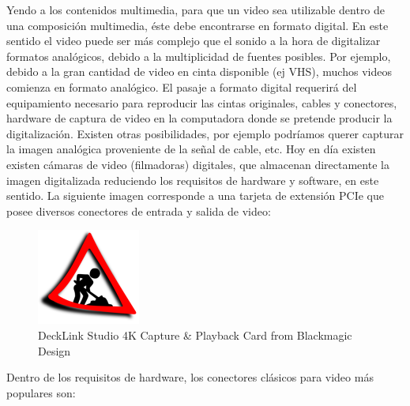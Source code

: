 \documentclass[12pt]{article}
\begin{document}
Yendo a los contenidos multimedia, para que un video sea utilizable dentro de 
una composición multimedia, éste debe encontrarse en formato digital. En este 
sentido el video puede ser más complejo que el sonido a la hora de digitalizar
formatos analógicos, debido a la multiplicidad de fuentes posibles. Por ejemplo, 
debido a la gran cantidad de video en cinta disponible (ej VHS), muchos videos 
comienza en formato analógico. El pasaje a formato digital requerirá del 
equipamiento necesario para reproducir las cintas originales, cables y conectores, 
hardware de captura de video en la computadora donde se pretende producir la 
digitalización. Existen otras posibilidades, por ejemplo podríamos querer 
capturar la imagen analógica proveniente de la señal de cable, etc. Hoy en día 
existen existen cámaras de video (filmadoras) digitales, que almacenan directamente
la imagen digitalizada reduciendo los requisitos de hardware y software, en este
sentido. La siguiente imagen corresponde a una tarjeta de extensión PCIe que posee
diversos conectores de entrada y salida de video: 


\begin{figure}[h]
\centering
\includegraphics{UN_CONSTRUCTION_2ss.png}
\renewcommand{\figurename}{Fig.}
\caption{DeckLink Studio 4K Capture \& Playback Card from Blackmagic Design}
\label{contexto:figura}
\end{figure}

Dentro de los requisitos de hardware, los conectores clásicos para video más 
populares son:
\end{document}
